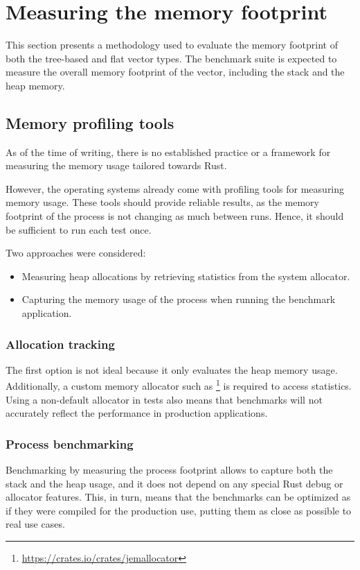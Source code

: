 \section{Measuring the memory footprint}
This section presents a methodology used to evaluate the memory footprint of both the tree-based and flat vector types. The benchmark suite is expected to measure the overall memory footprint of the vector, including the stack and the heap memory.

\subsection{Memory profiling tools}
As of the time of writing, there is no established practice or a framework for measuring the memory usage tailored towards Rust.

However, the operating systems already come with profiling tools for measuring memory usage. These tools should provide reliable results, as the memory footprint of the process is not changing as much between runs. Hence, it should be sufficient to run each test once.

Two approaches were considered:
\begin{itemize}
    \item Measuring heap allocations by retrieving statistics from the system allocator.
    \item Capturing the memory usage of the process when running the benchmark application.
\end{itemize}

\subsubsection*{Allocation tracking}
The first option is not ideal because it only evaluates the heap memory usage. Additionally, a custom memory allocator such as \footnote{\url{https://crates.io/crates/jemallocator}} is required to access statistics. Using a non-default allocator in tests also means that benchmarks will not accurately reflect the performance in production applications.

\subsubsection*{Process benchmarking}
Benchmarking by measuring the process footprint allows to capture both the stack and the heap usage, and it does not depend on any special Rust debug or allocator features. This, in turn, means that the benchmarks can be optimized as if they were compiled for the production use, putting them as close as possible to real use cases.

